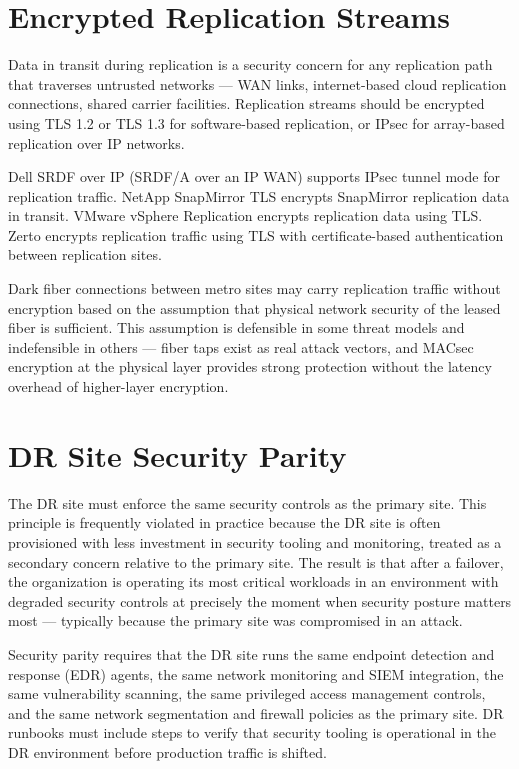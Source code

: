 \section{Encrypted Replication Streams}
Data in transit during replication is a security concern for any replication path that traverses untrusted networks --- WAN links, internet-based cloud replication connections, shared carrier facilities. Replication streams should be encrypted using TLS 1.2 or TLS 1.3 for software-based replication, or IPsec for array-based replication over IP networks.

Dell SRDF over IP (SRDF/A over an IP WAN) supports IPsec tunnel mode for replication traffic. NetApp SnapMirror TLS encrypts SnapMirror replication data in transit. VMware vSphere Replication encrypts replication data using TLS. Zerto encrypts replication traffic using TLS with certificate-based authentication between replication sites.

Dark fiber connections between metro sites may carry replication traffic without encryption based on the assumption that physical network security of the leased fiber is sufficient. This assumption is defensible in some threat models and indefensible in others --- fiber taps exist as real attack vectors, and MACsec encryption at the physical layer provides strong protection without the latency overhead of higher-layer encryption.

\section{DR Site Security Parity}
The DR site must enforce the same security controls as the primary site. This principle is frequently violated in practice because the DR site is often provisioned with less investment in security tooling and monitoring, treated as a secondary concern relative to the primary site. The result is that after a failover, the organization is operating its most critical workloads in an environment with degraded security controls at precisely the moment when security posture matters most --- typically because the primary site was compromised in an attack.

Security parity requires that the DR site runs the same endpoint detection and response (EDR) agents, the same network monitoring and SIEM integration, the same vulnerability scanning, the same privileged access management controls, and the same network segmentation and firewall policies as the primary site. DR runbooks must include steps to verify that security tooling is operational in the DR environment before production traffic is shifted.

